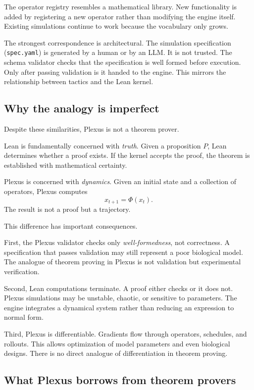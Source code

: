 \documentclass[11pt]{article}
\newcommand{\code}[1]{\texttt{#1}}
\begin{document}
The operator registry resembles a mathematical library. New functionality is added
by registering a new operator rather than modifying the engine itself. Existing
simulations continue to work because the vocabulary only grows.

The strongest correspondence is architectural. The simulation specification
(\code{spec.yaml}) is generated by a human or by an LLM. It is not trusted. The
schema validator checks that the specification is well formed before execution.
Only after passing validation is it handed to the engine. This mirrors the
relationship between tactics and the Lean kernel.

\subsection{Why the analogy is imperfect}

Despite these similarities, Plexus is not a theorem prover.

Lean is fundamentally concerned with \emph{truth}. Given a proposition $P$, Lean
determines whether a proof exists. If the kernel accepts the proof, the theorem is
established with mathematical certainty.

Plexus is concerned with \emph{dynamics}. Given an initial state and a collection
of operators, Plexus computes
\[
x_{t+1}=\Phi(x_t).
\]
The result is not a proof but a trajectory.

This difference has important consequences.

First, the Plexus validator checks only \emph{well-formedness}, not correctness. A
specification that passes validation may still represent a poor biological model.
The analogue of theorem proving in Plexus is not validation but experimental
verification.

Second, Lean computations terminate. A proof either checks or it does not. Plexus
simulations may be unstable, chaotic, or sensitive to parameters. The engine
integrates a dynamical system rather than reducing an expression to normal form.

Third, Plexus is differentiable. Gradients flow through operators, schedules, and
rollouts. This allows optimization of model parameters and even biological designs.
There is no direct analogue of differentiation in theorem proving.

\subsection{What Plexus borrows from theorem provers}
\end{document}
